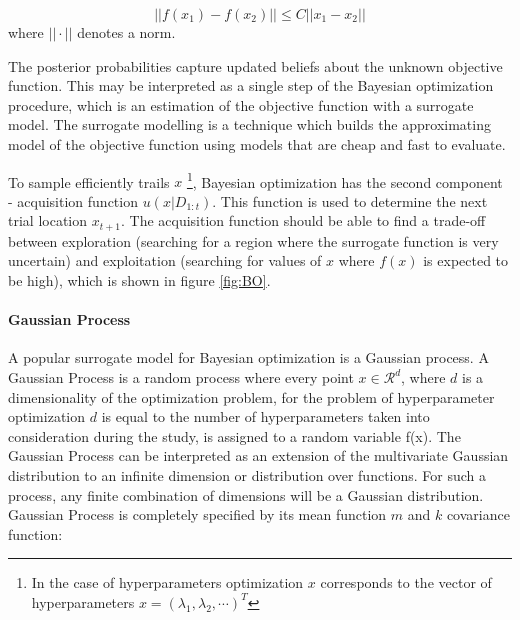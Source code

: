 \begin{equation}
||f(x_1)-f(x_2)|| \leq C ||x_1-x_2|| 
\end{equation}
where  $||\cdot ||$ denotes a norm.


The posterior probabilities capture updated beliefs about the unknown objective function. 
This may be interpreted as a single step of the Bayesian optimization procedure, which is an estimation of the objective function with a surrogate model. The surrogate modelling is a technique which builds the approximating model of the objective function using models that are cheap and fast to evaluate. 

To sample efficiently trails $x$ \footnote{In the case of hyperparameters optimization $x$ corresponds to the vector of hyperparameters $x= (\lambda_1, \lambda_2, \cdots)^{T}$}, Bayesian optimization has the second component - acquisition function $u(x|D_{1:t})$. This function is used to determine the next trial location $x_{t+1}$. The acquisition function should be able to find a trade-off between exploration (searching for a region where the surrogate function is very uncertain) and exploitation (searching for values of $x$ where $f(x)$ is expected to be high), which is shown in figure \ref{fig:BO}. 


\paragraph{Gaussian Process} \mbox{}

A popular surrogate model for Bayesian optimization is a Gaussian process. 
A Gaussian Process is a random process where every point $x \in \mathcal{R}^{d}$, where $d$ is a dimensionality of the optimization problem, for the problem of hyperparameter optimization $d$ is equal to the number of hyperparameters taken into consideration during the study, 
is assigned to a random variable f(x). The Gaussian Process can be interpreted as an extension of the multivariate Gaussian distribution to an infinite dimension or distribution over functions. For such a process, any finite combination of dimensions will be a Gaussian distribution. Gaussian Process is completely specified by its mean function $m$ and $k$ covariance function: 

